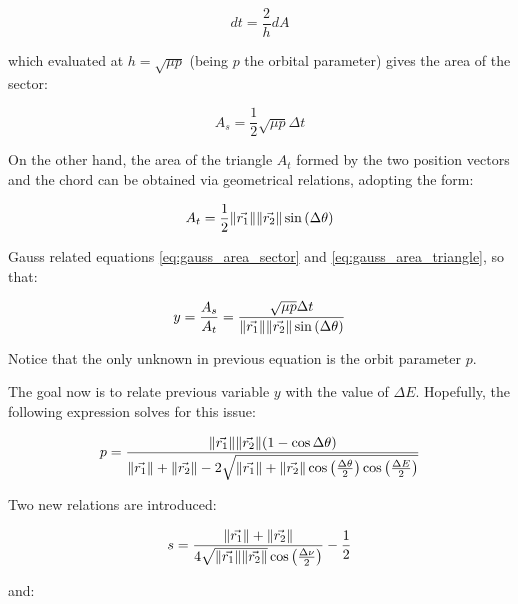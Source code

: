 \begin{equation}
  dt = \frac{2}{h}dA
\end{equation}

which evaluated at $h=\sqrt{\mu p}$ (being $p$ the orbital parameter) gives the
area of the sector:

\begin{equation}
  A_{s} = \frac{1}{2} \sqrt{\mu p} \Delta t
  \label{eq:gauss_area_sector}
\end{equation}

On the other hand, the area of the triangle $A_{t}$ formed by the two position
vectors and the chord can be obtained via geometrical relations, adopting the
form:

\begin{equation}
  A_{t} = \frac{1}{2} \lVert\vec{r_{1}}\rVert  \lVert\vec{r_{2}}\rVert \sin{(\Delta \theta)}
  \label{eq:gauss_area_triangle}
\end{equation}

Gauss related equations \ref{eq:gauss_area_sector} and
\ref{eq:gauss_area_triangle}, so that:

\begin{equation}
  y = \frac{A_s}{A_t} = \frac{\sqrt{\mu p} \Delta t}{\lVert\vec{r_{1}}\rVert  \lVert\vec{r_{2}}\rVert \sin{(\Delta \theta)}}
  \label{eq:gauss_y}
\end{equation}

Notice that the only unknown in previous equation is the orbit parameter $p$.

The goal now is to relate previous variable $y$ with the value of $\Delta E$.
Hopefully, the following expression solves for this issue:

\begin{equation}
  p = \frac{\lVert\vec{r_1}\rVert \lVert\vec{r_2}\rVert (1 - \cos{\Delta
      \theta})}{\lVert\vec{r_1}\rVert + \lVert\vec{r_2}\rVert - 2
    \sqrt{\lVert\vec{r_1}\rVert + \lVert\vec{r_2}\rVert \cos{\left(\frac{\Delta
          \theta}{2}\right)} \cos{\left(\frac{\Delta E}{2} \right)}}}
  \label{eq:p_as_of_E}
\end{equation}

Two new relations are introduced:

\begin{equation}
  s = \frac{\lVert\vec{r_1}\rVert + \lVert\vec{r_2}\rVert}{4\sqrt{\lVert\vec{r_1}\rVert
      \lVert\vec{r_2}\rVert}\cos{\left(\frac{\Delta \nu}{2} \right)} } - \frac{1}{2}
  \label{eq:gauss_s}
\end{equation}

and:

